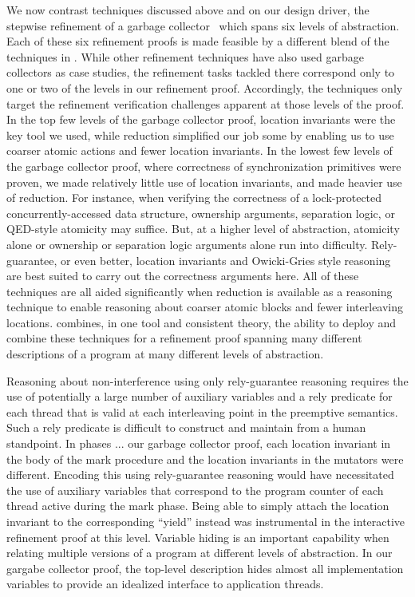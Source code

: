 We now contrast techniques discussed above and \civl on our design
driver, the stepwise refinement of a garbage collector~\cite{gc-techreport} which spans six levels of abstraction.
Each of these six refinement proofs is made feasible by a different
blend of the techniques in \civl. 
While other refinement techniques have also used garbage collectors as
case studies, the refinement tasks tackled there correspond only to one or two of the levels in 
our refinement proof. 
Accordingly, the techniques only target the refinement verification
challenges apparent at those levels of the proof. 
In the top few levels of the garbage collector proof, location
invariants were the key tool we used, while reduction simplified our
job some by enabling us to use coarser atomic actions and fewer
location invariants.  
In the lowest few levels of the garbage collector proof, where
correctness of synchronization primitives were proven, we made
relatively little use of location invariants, and made heavier use of
reduction.
For instance, when verifying the correctness of a
lock-protected concurrently-accessed data structure, ownership
arguments, separation logic, or QED-style atomicity may suffice. 
But,
at a higher level of abstraction, atomicity alone or ownership or
separation logic arguments alone run into difficulty. 
Rely-guarantee,
or even better, location invariants and Owicki-Gries style reasoning
are best suited to carry out the correctness arguments here. 
All of these
techniques are all aided significantly when reduction is available as
a reasoning technique to enable reasoning about coarser atomic blocks
and fewer interleaving locations. 
\civl combines, in one tool and consistent theory, the ability to
deploy and combine these techniques for a refinement proof spanning
many different descriptions of a program at many different levels of
abstraction. 

Reasoning about non-interference using only rely-guarantee reasoning requires the use of potentially a large number of auxiliary variables
and a rely predicate for each thread that is valid at each interleaving point in
the preemptive semantics. 
Such a rely predicate is difficult to construct and maintain from a
human standpoint.
In phases ... our garbage collector proof, each location invariant in
the body of the mark procedure and the location invariants in the
mutators were different. 
Encoding this using rely-guarantee reasoning would have necessitated
the use of auxiliary variables that correspond to the program counter
of each thread active during the mark phase. 
Being able to simply attach the location invariant to the
corresponding ``yield'' instead was instrumental in the interactive
refinement proof at this level. 
Variable hiding
is an important capability when relating multiple versions of a
program at different levels of abstraction. 
In our gargabe collector
proof, the top-level description hides almost all implementation
variables to provide an idealized interface to application threads. 


